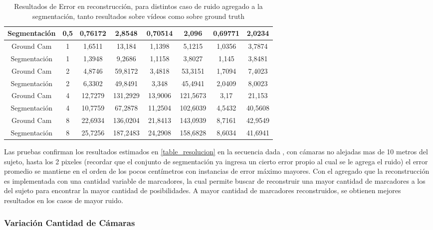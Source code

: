 \begin{table}[h]
\begin{tabular}{cc|c|c|c|c|c|c|}
\multicolumn{1}{|c|}{Segmentación} & 0,5 & 0,76172 & 2,8548 & 0,70514 & 2,096 & 0,69771 & 2,0234 \\ \hline
\multicolumn{1}{|c|}{Ground Cam} & 1 & 1,6511 & 13,184 & 1,1398 & 5,1215 & 1,0356 & 3,7874 \\ \hline
\multicolumn{1}{|c|}{Segmentación} & 1 & 1,3948 & 9,2686 & 1,1158 & 3,8027 & 1,145 & 3,8481 \\ \hline
\multicolumn{1}{|c|}{Ground Cam} & 2 & 4,8746 & 59,8172 & 3,4818 & 53,3151 & 1,7094 & 7,4023 \\ \hline
\multicolumn{1}{|c|}{Segmentación} & 2 & 6,3302 & 49,8491 & 3,348 & 45,4941 & 2,0409 & 8,0023 \\ \hline
\multicolumn{1}{|c|}{Ground Cam} & 4 & 12,7279 & 131,2929 & 13,9006 & 121,5673 & 3,17 & 21,153 \\ \hline
\multicolumn{1}{|c|}{Segmentación} & 4 & 10,7759 & 67,2878 & 11,2504 & 102,6039 & 4,5432 & 40,5608 \\ \hline
\multicolumn{1}{|c|}{Ground Cam} & 8 & 22,6934 & 136,0204 & 21,8413 & 143,0939 & 8,7161 & 42,9549 \\ \hline
\multicolumn{1}{|c|}{Segmentación} & 8 & 25,7256 & 187,2483 & 24,2908 & 158,6828 & 8,6034 & 41,6941 \\ \hline
\end{tabular}
\caption{Resultados de Error en reconstrucción, para distintos caso de ruido agregado a la segmentación, tanto resultados sobre vídeos como sobre ground truth}
\end{table}

Las pruebas confirman los resultados estimados en \ref{table_resolucion} en la secuencia dada , con cámaras no alejadas mas de 10 metros del sujeto, hasta los 2 pixeles (recordar que el conjunto de segmentación ya ingresa un cierto error propio al cual se le agrega el ruido) el error promedio se mantiene en el orden de los pocos centímetros con instancias de error máximo mayores. Con el agregado que la reconstrucción es implementada con una cantidad variable de marcadores, la cual permite buscar de reconstruir una mayor cantidad de marcadores a los del sujeto para encontrar la mayor cantidad de posibilidades. A mayor cantidad de marcadores reconstruidos, se obtienen mejores resultados en los casos de mayor ruido.

\subsubsection{Variación Cantidad de Cámaras}


